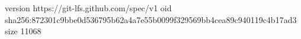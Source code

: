 version https://git-lfs.github.com/spec/v1
oid sha256:872301c9bbe0d536795b62a4a7e55b0099f329569bb4cea89c940119c4b17ad3
size 11068
